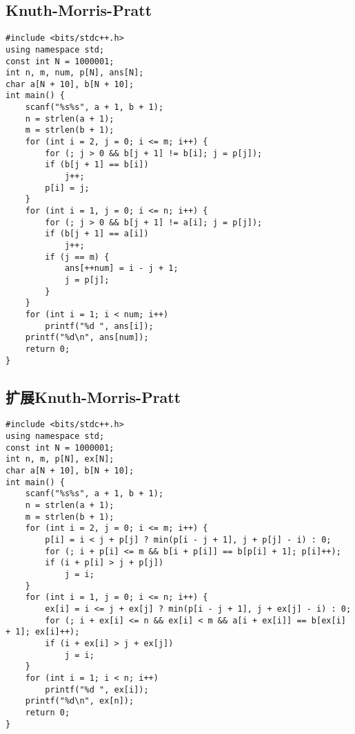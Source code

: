 \documentclass[a4paper]{article}
\begin{document}
\subsection{Knuth-Morris-Pratt}
\begin{lstlisting}
#include <bits/stdc++.h>
using namespace std;
const int N = 1000001;
int n, m, num, p[N], ans[N];
char a[N + 10], b[N + 10];
int main() {
    scanf("%s%s", a + 1, b + 1);
    n = strlen(a + 1);
    m = strlen(b + 1);
    for (int i = 2, j = 0; i <= m; i++) {
        for (; j > 0 && b[j + 1] != b[i]; j = p[j]);
        if (b[j + 1] == b[i])
            j++;
        p[i] = j;
    }
    for (int i = 1, j = 0; i <= n; i++) {
        for (; j > 0 && b[j + 1] != a[i]; j = p[j]);
        if (b[j + 1] == a[i])
            j++;
        if (j == m) {
            ans[++num] = i - j + 1;
            j = p[j];
        }
    }
    for (int i = 1; i < num; i++)
        printf("%d ", ans[i]);
    printf("%d\n", ans[num]);
    return 0;
}
\end{lstlisting}
\subsection{扩展Knuth-Morris-Pratt}
\begin{lstlisting}
#include <bits/stdc++.h>
using namespace std;
const int N = 1000001;
int n, m, p[N], ex[N];
char a[N + 10], b[N + 10];
int main() {
    scanf("%s%s", a + 1, b + 1);
    n = strlen(a + 1);
    m = strlen(b + 1);
    for (int i = 2, j = 0; i <= m; i++) {
        p[i] = i < j + p[j] ? min(p[i - j + 1], j + p[j] - i) : 0;
        for (; i + p[i] <= m && b[i + p[i]] == b[p[i] + 1]; p[i]++);
        if (i + p[i] > j + p[j])
            j = i;
    }
    for (int i = 1, j = 0; i <= n; i++) {
        ex[i] = i <= j + ex[j] ? min(p[i - j + 1], j + ex[j] - i) : 0;
        for (; i + ex[i] <= n && ex[i] < m && a[i + ex[i]] == b[ex[i] + 1]; ex[i]++);
        if (i + ex[i] > j + ex[j])
            j = i;
    }
    for (int i = 1; i < n; i++)
        printf("%d ", ex[i]);
    printf("%d\n", ex[n]);
    return 0;
}
\end{lstlisting}
\end{document}
